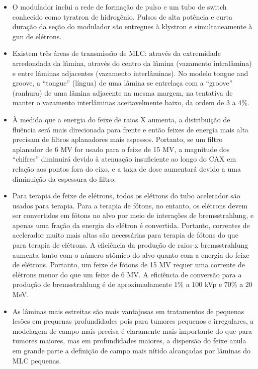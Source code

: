 \documentclass[11pt,a4paper]{article}
\newcounter{exemplo}
\begin{document}
\begin{exemplo}[Física]
\begin{itemize}
        \item O modulador inclui a rede de formação de pulso e um tubo de switch conhecido como tyratron de hidrogênio. Pulsos de alta potência e curta duração da seção do modulador são entregues à klystron e simultaneamente à gun de elétrons.
        
        \item Existem três áreas de transmissão de MLC: através da extremidade arredondada da lâmina, através do centro da lâmina (vazamento intralâmina) e entre lâminas adjacentes (vazamento interlâminas). No modelo tongue and groove, a “tongue” (língua) de uma lâmina se entrelaça com a “groove” (ranhura) de uma lâmina adjacente na mesma margem, na tentativa de manter o vazamento interlâminas aceitavelmente baixo, da ordem de 3 a 4\%.
        
        \item À medida que a energia do feixe de raios X aumenta, a distribuição de fluência será mais direcionada para frente e então feixes de energia mais alta precisam de filtros aplanadores mais espessos. Portanto, se um filtro aplanador de 6 MV for usado para o feixe de 15 MV, a magnitude dos ``chifres'' diminuirá devido à atenuação insuficiente ao longo do CAX em relação aos pontos fora do eixo, e a taxa de dose aumentará devido a uma diminuição da espessura do filtro.
        
        \item Para terapia de feixe de elétrons, todos os elétrons do tubo acelerador são usados para terapia. Para a terapia de fótons, no entanto, os elétrons devem ser convertidos em fótons no alvo por meio de interações de bremsstrahlung, e apenas uma fração da energia do elétron é convertida. Portanto, correntes de acelerador muito mais altas são necessárias para terapia de fótons do que para terapia de elétrons. A eficiência da produção de raios-x bremsstrahlung aumenta tanto com o número atômico do alvo quanto com a energia do feixe de elétrons. Portanto, um feixe de fótons de 15 MV requer uma corrente de elétrons menor do que um feixe de 6 MV. A eficiência de conversão para a produção de bremsstrahlung é de aproximadamente 1\% a 100 kVp e 70\% a 20 MeV.
        
        \item As lâminas mais estreitas são mais vantajosas em tratamentos de pequenas lesões em pequenas profundidades pois para tumores pequenos e irregulares, a modelagem de campo mais precisa é claramente mais importante do que para tumores maiores, mas em profundidades maiores, a dispersão do feixe anula em grande parte a definição de campo mais nítido alcançadas por lâminas do MLC pequenas.
        

\end{itemize}
\end{exemplo}
\end{document}
